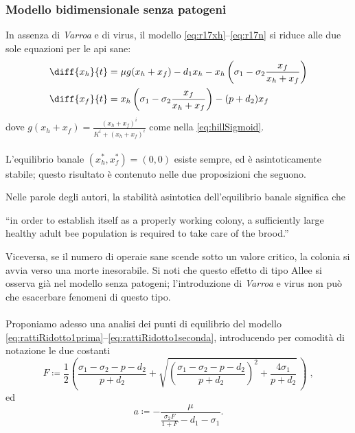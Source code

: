 \subsubsection{Modello bidimensionale senza patogeni}
In assenza di \emph{Varroa} e di virus, il modello \eqref{eq:r17xh}--\eqref{eq:r17n} si riduce alle due sole equazioni per le api sane:
\begin{align}
    \diff{x_h}{t} &= \mu g( x_h + x_f ) - d_1 x_h - x_h \left( \sigma_1 - \sigma_2 \frac{x_f}{x_h + x_f} \right)
    \label{eq:rattiRidotto1prima}
    \\
    \diff{x_f}{t} &= x_h \left( \sigma_1 - \sigma_2 \frac{x_f}{x_h + x_f} \right) - (p + d_2) x_f
    \label{eq:rattiRidotto1seconda}
\end{align}
dove $g(x_h + x_f) = \frac{ (x_h+x_f)^i }{ K^i + (x_h+x_f)^i }$ come nella \eqref{eq:hillSigmoid}.

\paragraph{}
L'equilibrio banale $(x_h^*, x_f^*) = (0,0)$ esiste sempre, ed è asintoticamente stabile; questo risultato è contenuto nelle due proposizioni che seguono.

Nelle parole degli autori, la stabilità asintotica dell'equilibrio banale significa che
\begin{displayquote}
``\omissis in order to establish itself as a properly working colony, a sufficiently large healthy adult bee population is required to take care of the brood.''
\end{displayquote}

Viceversa, se il numero di operaie sane scende sotto un valore critico, la colonia si avvia verso una morte inesorabile.
Si noti che questo effetto di tipo Allee si osserva già nel modello senza patogeni; l'introduzione di \emph{Varroa} e virus non può che esacerbare fenomeni di questo tipo.

\paragraph{}
Proponiamo adesso una analisi dei punti di equilibrio del modello \eqref{eq:rattiRidotto1prima}--\eqref{eq:rattiRidotto1seconda}, introducendo per comodità di notazione le due costanti
\begin{equation}
    F \coloneq \frac{1}{2} \left( \frac{ \sigma_1 - \sigma_2 - p - d_2 }{p+d_2} +
    \sqrt{ {\left( \frac{ \sigma_1 - \sigma_2 - p - d_2 }{p+d_2} \right)}^2 + \frac{4 \sigma_1}{p+d_2} } \, \right)
    \; ,
    \label{eq:rattiFconst}
\end{equation}
ed
$$ a \coloneq - \frac{ \mu }{ \frac{\sigma_2 F}{1+F} - d_1 - \sigma_1 }.$$

